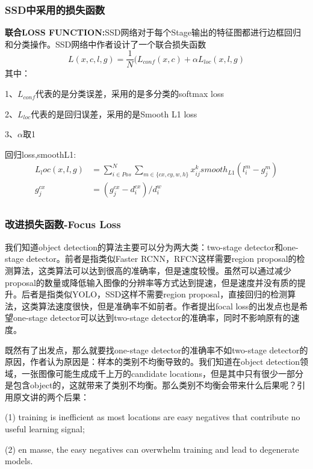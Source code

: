\subsubsection{SSD中采用的损失函数}
\textbf{联合LOSS FUNCTION:}SSD网络对于每个Stage输出的特征图都进行边框回归和分类操作。SSD网络中作者设计了一个联合损失函数
\[
	L(x,c,l,g) = \frac{1}{N}(L_{conf}(x,c) + \alpha L_{loc}(x,l,g)
\]
其中：

 1、$L_{conf}$代表的是分类误差，采用的是多分类的softmax loss
 
 2、$L_{loc}$代表的是回归误差，采用的是Smooth L1 loss
 
 3、$\alpha$取1
 
 回归loss,smoothL1:
\begin{align*}
 L_loc(x,l,g) &= \sum _{i \in Pos} ^{N} \sum_{m \in \{cx,cy,w,h\}} x_{ij}^k smooth _{L1} (l_i ^m - g_j ^m) \\
 g_j^{cx} &= \left( g_j ^{cx} - d_i ^{cx} \right) / d_i ^w \\
 
\end{align*}

\subsubsection{改进损失函数-Focus Loss}
我们知道object detection的算法主要可以分为两大类：two-stage detector和one-stage detector。前者是指类似Faster RCNN，RFCN这样需要region proposal的检测算法，这类算法可以达到很高的准确率，但是速度较慢。虽然可以通过减少proposal的数量或降低输入图像的分辨率等方式达到提速，但是速度并没有质的提升。后者是指类似YOLO，SSD这样不需要region proposal，直接回归的检测算法，这类算法速度很快，但是准确率不如前者。作者提出focal loss的出发点也是希望one-stage detector可以达到two-stage detector的准确率，同时不影响原有的速度。

既然有了出发点，那么就要找one-stage detector的准确率不如two-stage detector的原因，作者认为原因是：样本的类别不均衡导致的。我们知道在object detection领域，一张图像可能生成成千上万的candidate locations，但是其中只有很少一部分是包含object的，这就带来了类别不均衡。那么类别不均衡会带来什么后果呢？引用原文讲的两个后果：

(1) training is inefficient as most locations are easy negatives that contribute no useful learning signal; 

(2) en masse, the easy negatives can overwhelm training and lead to degenerate models. 

